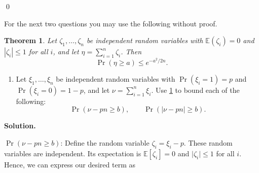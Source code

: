 \documentclass[11pt,letterpaper]{article}
\newtheorem{theorem}{Theorem}[section]
\theoremstyle{definition}
\newcommand{\EE}{\mathbb{E}}
\newcommand{\solution}{\medskip\noindent\textbf{Solution.}\par\medskip}
\newcommand{\Var}{\mathrm{Var}}
\begin{document}

\qed

\noindent For the next two questions you may use the following without proof.


\begin{theorem}\label{thm:hoeffding}
Let $\zeta_1,\dots,\zeta_n$ be independent random variables with $\EE(\zeta_i) = 0$ and $|\zeta_i|\leq 1$ for all $i$, and let $\eta = \sum_{i=1}^n \zeta_i$. Then
\[
\Pr(\eta\geq a)\leq e^{-a^2/2n}.
\]
\end{theorem}

\begin{enumerate}[resume]
\item Let $\xi_1,\dots,\xi_n$ be independent random variables with $\Pr(\xi_i = 1) = p$ and $\Pr(\xi_i = 0) = 1-p$, and let $\nu = \sum_{i=1}^n \xi_i$. Use \cref{thm:hoeffding} to bound each of the following:
\[
\Pr(\nu - pn\geq b), \qquad \Pr(|\nu - pn|\geq b).
\]
\end{enumerate}

\solution
\ul{$\Pr(\nu - pn\geq b)$}:
Define the random variable $\zeta_i = \xi_i -p$. 
These random variables are independent.
Its expectation is $\EE[\zeta_i]=0$ and $\lvert \zeta_i\rvert\leq 1$ for all $i$. 
Hence, we can express our desired term as
\end{document}
